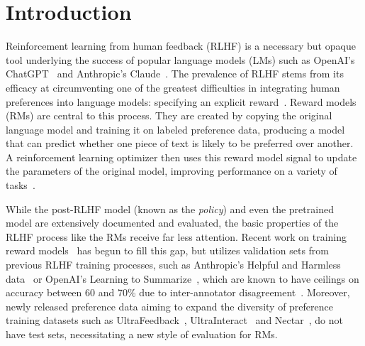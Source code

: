 \section{Introduction}
Reinforcement learning from human feedback (RLHF) is a necessary but opaque tool underlying the success of popular language models (LMs) such as OpenAI's ChatGPT~\citep{ChatGPT} and Anthropic's Claude~\citep{bai2022training}. 
The prevalence of RLHF stems from its efficacy at circumventing one of the greatest difficulties in integrating human preferences into language models: specifying an explicit reward~\citep{christiano2017deep}. 
Reward models (RMs) are central to this process. 
They are created by copying the original language model and training it on labeled preference data, producing a model that can predict whether  one piece of text is likely to be preferred over another. 
A reinforcement learning optimizer then uses this reward model signal to update the parameters of the original model, improving performance on a variety of tasks~\citep{ouyang2022training, touvron2023llama}.

While the post-RLHF model (known as the \textit{policy}) and even the pretrained model are extensively documented and evaluated, the basic properties of the RLHF process like the RMs receive far less attention. 
Recent work on training reward models~\citep{starling2023, llm-blender-2023} has begun to fill this gap, but utilizes validation sets from previous RLHF training processes, such as Anthropic's Helpful and Harmless data~\citep{bai2022training} or OpenAI's Learning to Summarize~\citep{stiennon2020learning}, which are known to have ceilings on accuracy between 60 and 70\% due to inter-annotator disagreement~\citep{wang2024secrets}. 
Moreover, newly released preference data aiming to expand the diversity of preference training datasets such as UltraFeedback~\citep{cui2023ultrafeedback}, UltraInteract~\citep{yuan2024advancing} and Nectar~\citep{starling2023}, do not have test sets, necessitating a new style of evaluation for RMs.  


